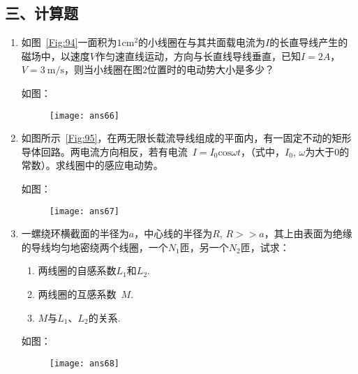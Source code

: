 \subsection*{三、计算题}
\begin{enumerate}
    \item 如图~\ref{Fig:94}一面积为$1\mathrm{cm}^2$的小线圈在与其共面载电流为$I$的长直导线产生的磁场中，以速度$V$作匀速直线运动，方向与长直线导线垂直，已知$I=2A$，$V=3\ \mathrm{m/s}$，则当小线圈在图2位置时的电动势大小是多少？
    \begin{solution}
        如图：
        \begin{figure}[H]
            \centering
            \texttt{[image: ans66]}
        \end{figure}
    \end{solution}
    \item 如图所示~\ref{Fig:95}，在两无限长载流导线组成的平面内，有一固定不动的矩形导体回路。两电流方向相反，若有电流~$I=I_0\mathrm{cos}\omega t$，（式中，$I_0$, $\omega$为大于0的常数）。求线圈中的感应电动势。
    \begin{solution}
        如图：
        \begin{figure}[H]
            \centering
            \texttt{[image: ans67]}
        \end{figure}
    \end{solution}
    \item 一螺绕环横截面的半径为$a$，中心线的半径为$R$, $R>>a$，其上由表面为绝缘的导线均匀地密绕两个线圈，一个$N_1$匝，另一个$N_2$匝，试求：
    \begin{enumerate}[label=(\arabic*)]
        \item 两线圈的自感系数$L_1$和$L_2$.
        \item 两线圈的互感系数~$M$.
        \item $M$与$L_1$、$L_2$的关系.
    \end{enumerate}
    \begin{solution}
        如图：
        \begin{figure}[H]
            \centering
            \texttt{[image: ans68]}
        \end{figure}
    \end{solution}
\end{enumerate}